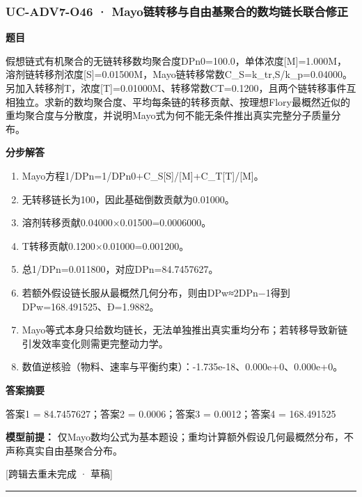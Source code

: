 \documentclass[UTF8,11pt,a4paper]{ctexart}
\begin{document}
\subsubsection*{UC-ADV7-O46 · Mayo链转移与自由基聚合的数均链长联合修正}
\noindent\textbf{题目}\par
假想链式有机聚合的无链转移数均聚合度DPn0=100.0，单体浓度[M]=1.000M，溶剂链转移剂浓度[S]=0.01500M，Mayo链转移常数C\_S=k\_tr,S/k\_p=0.04000。另加入转移剂T，浓度[T]=0.01000M、转移常数CT=0.1200，且两个链转移事件互相独立。求新的数均聚合度、平均每条链的转移贡献、按理想Flory最概然近似的重均聚合度与分散度，并说明Mayo式为何不能无条件推出真实完整分子质量分布。\par
\medskip\noindent\textbf{分步解答}
\begin{enumerate}
\item Mayo方程1/DPn=1/DPn0+C\_S[S]/[M]+C\_T[T]/[M]。
\item 无转移链长为100，因此基础倒数贡献为0.01000。
\item 溶剂转移贡献0.04000×0.01500=0.0006000。
\item T转移贡献0.1200×0.01000=0.001200。
\item 总1/DPn=0.011800，对应DPn=84.7457627。
\item 若额外假设链长服从最概然几何分布，则由DPw≈2DPn−1得到DPw=168.491525、Đ=1.9882。
\item Mayo等式本身只给数均链长，无法单独推出真实重均分布；若转移导致新链引发效率变化则需更完整动力学。
\item 数值逆核验（物料、速率与平衡约束）：-1.735e-18、0.000e+0、0.000e+0。
\end{enumerate}
\noindent\textbf{答案摘要}\par
答案1 = 84.7457627；答案2 = 0.0006；答案3 = 0.0012；答案4 = 168.491525\par
\noindent\textbf{模型前提：}
仅Mayo数均公式为基本题设；重均计算额外假设几何最概然分布，不声称真实自由基聚合分布。\par
\noindent\textcolor{red!65!black}{[跨辑去重未完成 · 草稿]} \par
\medskip\hrule\medskip
{}
\end{document}
